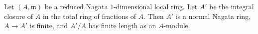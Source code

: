 \begin{lemma}
\label{lemma-pre-delta-invariant}
Let $(A, \mathfrak m)$ be a reduced Nagata $1$-dimensional local ring.
Let $A'$ be the integral closure of $A$ in the total ring of fractions
of $A$. Then $A'$ is a normal Nagata ring, $A \to A'$ is finite, and
$A'/A$ has finite length as an $A$-module.
\end{lemma}
